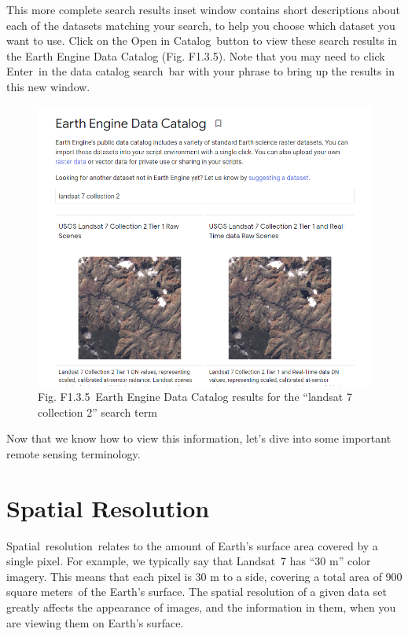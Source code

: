 \documentclass[
  letterpaper,
  DIV=11,
  numbers=noendperiod]{scrreprt}
\begin{document}
This more complete search results inset window contains short
descriptions about each of the datasets matching your search, to help
you choose which dataset you want to use. Click on the Open in
Catalog~button to view these search results in the Earth Engine Data
Catalog (Fig. F1.3.5). Note that you may need to click Enter~in the data
catalog search~bar with your phrase to bring up the results in this new
window.

\begin{figure}

{\centering \includegraphics{./F1/image44.png}

}

\caption{Fig. F1.3.5~Earth Engine Data Catalog results for the ``landsat
7 collection 2'' search term}

\end{figure}

Now that we know how to view this information, let's dive into some
important remote sensing terminology.

\hypertarget{spatial-resolution-1}{%
\section{Spatial Resolution}\label{spatial-resolution-1}}

Spatial~resolution~relates to the amount of Earth's surface area covered
by a single pixel. For example, we typically say that Landsat~7 has ``30
m'' color imagery. This means that each pixel is 30 m to a side,
covering a total area of 900 square meters~of the Earth's surface. The
spatial resolution of a given data set greatly affects the appearance of
images, and the information in them, when you are viewing them on
Earth's surface.
\end{document}
